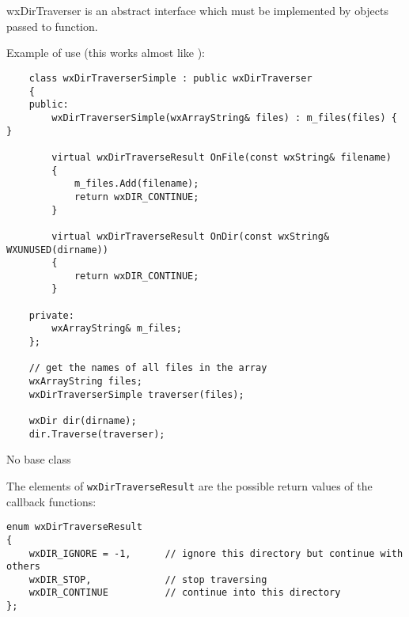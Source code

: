 
\section{}\label{wxdirtraverser}

wxDirTraverser is an abstract interface which must be implemented by objects
passed to  function.

Example of use (this works almost like ):

\begin{verbatim}
    class wxDirTraverserSimple : public wxDirTraverser
    {
    public:
        wxDirTraverserSimple(wxArrayString& files) : m_files(files) { }

        virtual wxDirTraverseResult OnFile(const wxString& filename)
        {
            m_files.Add(filename);
            return wxDIR_CONTINUE;
        }

        virtual wxDirTraverseResult OnDir(const wxString& WXUNUSED(dirname))
        {
            return wxDIR_CONTINUE;
        }

    private:
        wxArrayString& m_files;
    };

    // get the names of all files in the array
    wxArrayString files;
    wxDirTraverserSimple traverser(files);

    wxDir dir(dirname);
    dir.Traverse(traverser);
\end{verbatim}


No base class


The elements of {\tt wxDirTraverseResult} are the possible return values of the
callback functions:

{\small
\begin{verbatim}
enum wxDirTraverseResult
{
    wxDIR_IGNORE = -1,      // ignore this directory but continue with others
    wxDIR_STOP,             // stop traversing
    wxDIR_CONTINUE          // continue into this directory
};
\end{verbatim}
}

